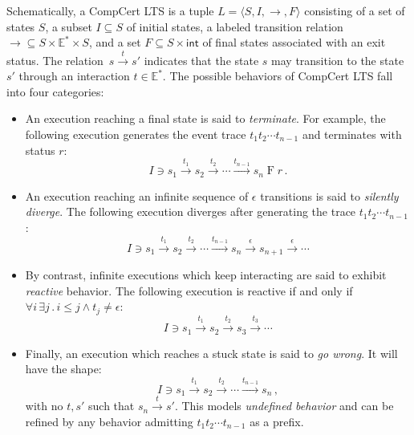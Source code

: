 \documentclass[sigplan,10pt,review,anonymous]{acmart}\settopmatter{printfolios=true,printccs=false,printacmref=false}
\newcommand{\kw}[1]{\ensuremath{ \mathsf{#1} }}
\begin{document}
Schematically, a CompCert LTS
is a tuple
$L = \langle S, I, {\rightarrow}, F \rangle$
consisting of
a set of states $S$,
a subset $I \subseteq S$ of initial states,
a labeled transition relation
${\rightarrow} \subseteq S \times \mathbb{E}^* \times S$,
and a set
$F \subseteq S \times \kw{int}$
of final states associated with an exit status.
The relation~$s \stackrel{t}{\rightarrow} s'$
indicates that the state $s$ may transition to the state $s'$
through an interaction $t \in \mathbb{E}^*$.
The possible behaviors of CompCert LTS fall into four categories:
\begin{itemize}
\item An execution reaching a final state is said to
    \emph{terminate}.
    For example,
    the following execution generates
    the event trace $t_1 t_2 \cdots t_{n-1}$
    and terminates with status $r$:
    \[
        I \ni s_1 \stackrel{t_1}{\rightarrow}
          s_2 \stackrel{t_2}{\rightarrow}
          \cdots \stackrel{t_{n-1}}{\rightarrow}
          s_n \mathrel{F} r \,.
    \]
\item An execution reaching
    an infinite sequence of $\epsilon$ transitions
    is said to \emph{silently diverge}.
    The following execution diverges after
    generating the trace $t_1 t_2 \cdots t_{n-1}$:
    \[
        I \ni s_1 \stackrel{t_1}{\rightarrow}
          s_2 \stackrel{t_2}{\rightarrow}
          \cdots \stackrel{t_{n-1}}{\rightarrow}
          s_n \stackrel{\epsilon}{\rightarrow}
          s_{n+1} \stackrel{\epsilon}{\rightarrow}
          \cdots
    \]
\item By contrast,
    infinite executions which keep interacting
    are said to exhibit \emph{reactive} behavior.
    The following execution
    is reactive if and only if
    $\forall i \, \exists j \,.\, i \le j \wedge t_j \ne \epsilon$:
    \[
        I \ni s_1 \stackrel{t_1}{\rightarrow}
          s_2 \stackrel{t_2}{\rightarrow}
          s_3 \stackrel{t_3}{\rightarrow}
          \cdots
    \]
\item Finally, an execution which reaches a stuck state
    is said to \emph{go wrong}. It will have the shape:
    \[
        I \ni s_1 \stackrel{t_1}{\rightarrow}
          s_2 \stackrel{t_2}{\rightarrow}
          \cdots \stackrel{t_{n-1}}{\rightarrow}
          s_n \,,
    \]
    with no $t, s'$ such that
    $s_n \stackrel{t}{\rightarrow} s'$.
    This models \emph{undefined behavior}
    and can be refined by any behavior
    admitting $t_1 t_2 \cdots t_{n-1}$ as a prefix.
\end{itemize}
\end{document}
